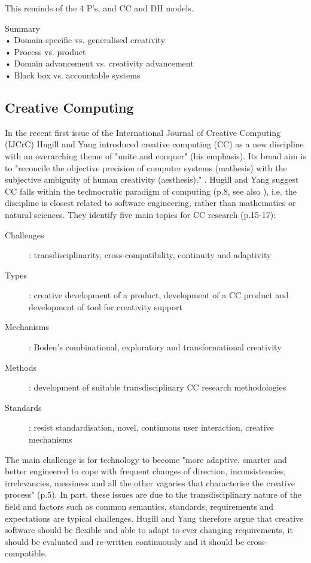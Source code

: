 \begin{draft}
  This reminds of the 4 P’s, and CC and DH models.
\end{draft}

\begin{shaded}
  Summary\\
  •	Domain-specific vs. generalised creativity\\
  •	Process vs. product\\
  •	Domain advancement vs. creativity advancement\\
  •	Black box vs. accountable systems
\end{shaded}


\subsection{Creative Computing}


In the recent first issue of the International Journal of Creative Computing (IJCrC) Hugill and Yang introduced creative computing (CC) as a new discipline \citep{Hugill2013c} with an overarching theme of "unite and conquer" \citep[p.1]{Yang2013}(his emphasis). Its broad aim is to "reconcile the objective precision of computer systems (mathesis) with the subjective ambiguity of human creativity (aesthesis)." \citep[p.5]{Hugill2013c}. Hugill and Yang suggest CC falls within the technocratic paradigm of computing (p.8, see also \citep{Eden2007}), i.e. the discipline is closest related to software engineering, rather than mathematics or natural sciences. They identify five main topics for CC research (p.15-17):

\begin{description}
  \item [Challenges]: transdisciplinarity, cross-compatibility, continuity and adaptivity
  \item [Types]: creative development of a product, development of a CC product and development of tool for creativity support
  \item [Mechanisms]:	Boden’s combinational, exploratory and transformational creativity
  \item [Methods]: development of suitable transdisciplinary CC research methodologies
  \item [Standards]: resist standardisation, novel, continuous user interaction, creative mechanisms
\end{description}

The main challenge is for technology  to become "more adaptive, smarter and better engineered to cope with frequent changes of direction, inconsistencies, irrelevancies, messiness and all the other vagaries that characterise the creative process" (p.5). In part, these issues are due to the transdisciplinary nature of the field and factors such as common semantics, standards, requirements and expectations are typical challenges. Hugill and Yang therefore argue that creative software should be flexible and able to adapt to ever changing requirements, it should be evaluated and re-written continuously and it should be cross-compatible.

